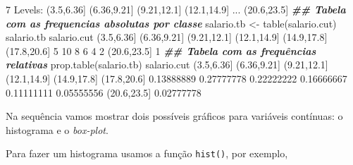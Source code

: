 \documentclass[
  10pt,
  a4paper]{book}
\newenvironment{Shaded}{\begin{snugshade}}{\end{snugshade}}
\newcommand{\DecValTok}[1]{\textcolor[rgb]{0.00,0.00,0.81}{#1}}
\newcommand{\DocumentationTok}[1]{\textcolor[rgb]{0.56,0.35,0.01}{\textbf{\textit{#1}}}}
\newcommand{\FloatTok}[1]{\textcolor[rgb]{0.00,0.00,0.81}{#1}}
\newcommand{\FunctionTok}[1]{\textcolor[rgb]{0.00,0.00,0.00}{#1}}
\newcommand{\NormalTok}[1]{#1}
\newcommand{\OtherTok}[1]{\textcolor[rgb]{0.56,0.35,0.01}{#1}}
\newcommand{\SpecialCharTok}[1]{\textcolor[rgb]{0.00,0.00,0.00}{#1}}
\begin{document}
\begin{Shaded}
\begin{Highlighting}[]
\DecValTok{7}\NormalTok{ Levels}\SpecialCharTok{:}\NormalTok{ (}\FloatTok{3.5}\NormalTok{,}\FloatTok{6.36}\NormalTok{] (}\FloatTok{6.36}\NormalTok{,}\FloatTok{9.21}\NormalTok{] (}\FloatTok{9.21}\NormalTok{,}\FloatTok{12.1}\NormalTok{] (}\FloatTok{12.1}\NormalTok{,}\FloatTok{14.9}\NormalTok{] }\FunctionTok{...}\NormalTok{ (}\FloatTok{20.6}\NormalTok{,}\FloatTok{23.5}\NormalTok{]}
\DocumentationTok{\#\# Tabela com as frequencias absolutas por classe}
\NormalTok{salario.tb }\OtherTok{\textless{}{-}} \FunctionTok{table}\NormalTok{(salario.cut)}
\NormalTok{salario.tb}
\NormalTok{salario.cut}
\NormalTok{ (}\FloatTok{3.5}\NormalTok{,}\FloatTok{6.36}\NormalTok{] (}\FloatTok{6.36}\NormalTok{,}\FloatTok{9.21}\NormalTok{] (}\FloatTok{9.21}\NormalTok{,}\FloatTok{12.1}\NormalTok{] (}\FloatTok{12.1}\NormalTok{,}\FloatTok{14.9}\NormalTok{] (}\FloatTok{14.9}\NormalTok{,}\FloatTok{17.8}\NormalTok{] (}\FloatTok{17.8}\NormalTok{,}\FloatTok{20.6}\NormalTok{] }
          \DecValTok{5}          \DecValTok{10}           \DecValTok{8}           \DecValTok{6}           \DecValTok{4}           \DecValTok{2} 
\NormalTok{(}\FloatTok{20.6}\NormalTok{,}\FloatTok{23.5}\NormalTok{] }
          \DecValTok{1} 
\DocumentationTok{\#\# Tabela com as frequências relativas}
\FunctionTok{prop.table}\NormalTok{(salario.tb)}
\NormalTok{salario.cut}
\NormalTok{ (}\FloatTok{3.5}\NormalTok{,}\FloatTok{6.36}\NormalTok{] (}\FloatTok{6.36}\NormalTok{,}\FloatTok{9.21}\NormalTok{] (}\FloatTok{9.21}\NormalTok{,}\FloatTok{12.1}\NormalTok{] (}\FloatTok{12.1}\NormalTok{,}\FloatTok{14.9}\NormalTok{] (}\FloatTok{14.9}\NormalTok{,}\FloatTok{17.8}\NormalTok{] (}\FloatTok{17.8}\NormalTok{,}\FloatTok{20.6}\NormalTok{] }
 \FloatTok{0.13888889}  \FloatTok{0.27777778}  \FloatTok{0.22222222}  \FloatTok{0.16666667}  \FloatTok{0.11111111}  \FloatTok{0.05555556} 
\NormalTok{(}\FloatTok{20.6}\NormalTok{,}\FloatTok{23.5}\NormalTok{] }
 \FloatTok{0.02777778} 
\end{Highlighting}
\end{Shaded}

Na sequência vamos mostrar dois possíveis gráficos para variáveis
contínuas: o histograma e o \emph{box-plot}.

Para fazer um histograma usamos a função \texttt{hist()}, por exemplo,

\begin{Shaded}
\end{Shaded}
\end{document}
